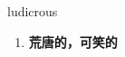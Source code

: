 
\begin{frame}
{\huge ludicrous}
\begin{center}
\begin{enumerate}\Large
  \item \textbf{荒唐的，可笑的}
\end{enumerate}
\end{center}
\end{frame}
